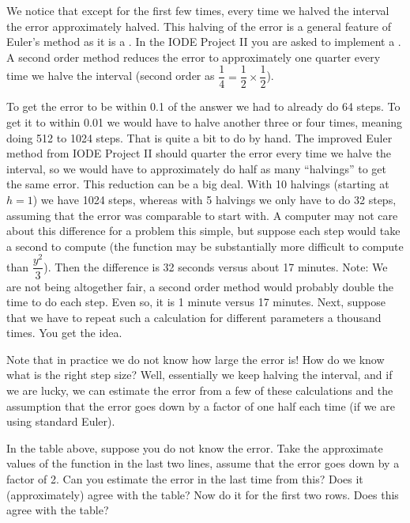 We notice that except for the first few times, every time we halved 
the interval the error approximately halved.
This halving of the error is a general feature of Euler's method as it is a
.  In the IODE Project II you are
asked to implement a .
A second order method reduces the error to approximately one
quarter every time we halve the interval (second order as $\dfrac{1}{4} =
\dfrac{1}{2} \times \dfrac{1}{2}$).

To get the error to be within 0.1 of the answer we had to already
do 64 steps.  To get it to within 0.01 we would have to halve another three or
four times, meaning doing 512 to 1024 steps.  That is quite a bit to do by
hand.  The improved Euler method from IODE  Project II should quarter the
error every time we
halve the interval, so we would have to approximately do half as many
``halvings'' to get the same error.  This reduction can be a big deal.  With 10
halvings (starting at $h=1$) we have 1024 steps, whereas with 5 halvings
we only have to do 32 steps, assuming that the error was comparable to start
with.  A computer may not care about this
difference for a problem this simple, but suppose each step would take a
second to compute (the function may be substantially more difficult to compute
than $\dfrac{y^2}{3}$).  Then the difference is 32 seconds versus about 17 minutes.
Note: We are not being altogether fair, a second order method would probably
double the time to do each step.  Even so, it is 1 minute versus 17 minutes.
Next, suppose that we have to repeat such a calculation for different
parameters a thousand times.  You get the idea.

Note that in practice we do not know how large the error is!
How do we know what is
the right step size?  Well, essentially we keep halving the interval, and if we
are lucky, we can estimate the error from a few of these calculations and the
assumption that the error goes down by a factor of one half each time (if
we are using standard Euler).

\medskip

 In the table above, suppose you do not know the error.  Take
the approximate values of the function in the last two lines,
assume that the error goes down by a factor of 2.  Can you estimate the
error in the last time from this?  Does it (approximately) agree with the
table?  Now do it for the first two rows.  Does this agree with the table?

